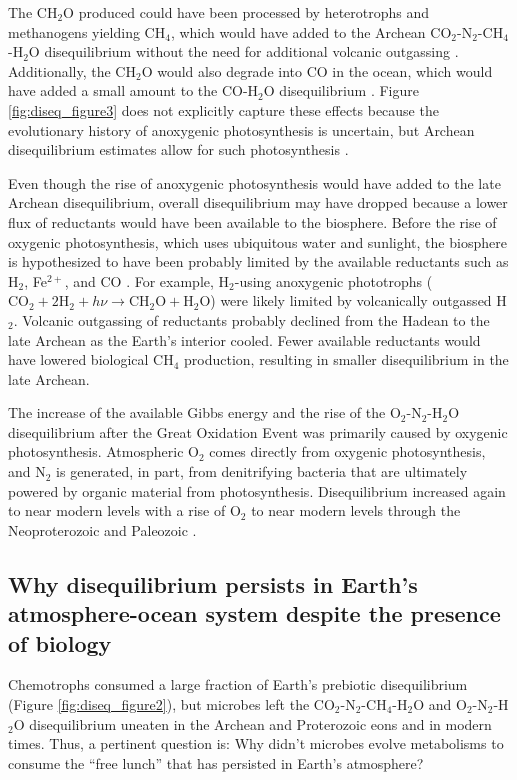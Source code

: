 The CH$_2$O produced could have been processed by heterotrophs and methanogens yielding CH$_4$, which would have added to the Archean CO$_2$-N$_2$-CH$_4$-H$_2$O disequilibrium without the need for additional volcanic outgassing \citep{KrissansenTotton_2018_diseq}. Additionally, the CH$_2$O would also degrade into CO in the ocean, which would have added a small amount to the CO-H$_2$O disequilibrium \citep{Schwieterman_2019}. Figure \ref{fig:diseq_figure3} does not explicitly capture these effects because the evolutionary history of anoxygenic photosynthesis is uncertain, but Archean disequilibrium estimates allow for such photosynthesis \citep{KrissansenTotton_2018_diseq}.

Even though the rise of anoxygenic photosynthesis would have added to the late Archean disequilibrium, overall disequilibrium may have dropped because a lower flux of reductants would have been available to the biosphere. Before the rise of oxygenic photosynthesis, which uses ubiquitous water and sunlight, the biosphere is hypothesized to have been probably limited by the available reductants such as H$_2$, Fe$^{2+}$, and CO \citep{Canfield_2006}. For example, H$_2$-using anoxygenic phototrophs ($\mathrm{CO_2} + 2 \mathrm{H_2} + h\nu \rightarrow \mathrm{CH_2O} + \mathrm{H_2O}$) were likely limited by volcanically outgassed H$_2$. Volcanic outgassing of reductants probably declined from the Hadean to the late Archean as the Earth's interior cooled. Fewer available reductants would have lowered biological CH$_4$ production, resulting in smaller disequilibrium in the late Archean.

The increase of the available Gibbs energy and the rise of the O$_2$-N$_2$-H$_2$O disequilibrium after the Great Oxidation Event was primarily caused by oxygenic photosynthesis. Atmospheric O$_2$ comes directly from oxygenic photosynthesis, and N$_2$ is generated, in part, from denitrifying bacteria that are ultimately powered by organic material from photosynthesis. Disequilibrium increased again to near modern levels with a rise of O$_2$ to near modern levels through the Neoproterozoic and Paleozoic \citep{Krause_2018}.

\subsection{Why disequilibrium persists in Earth's atmosphere-ocean system despite the presence of biology}

Chemotrophs consumed a large fraction of Earth's prebiotic disequilibrium (Figure \ref{fig:diseq_figure2}), but microbes left the CO$_2$-N$_2$-CH$_4$-H$_2$O and O$_2$-N$_2$-H$_2$O disequilibrium uneaten in the Archean and Proterozoic eons and in modern times. Thus, a pertinent question is: Why didn't microbes evolve metabolisms to consume the ``free lunch'' that has persisted in Earth's atmosphere?


